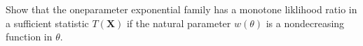 
\begin{exercise}

Show that the oneparameter exponential family has a monotone liklihood ratio in a sufficient statistic $T(\mathbf X)$ if the natural parameter $w(\theta)$ is a nondecreasing function in $\theta$.

\end{exercise}


\begin{solution}

\phantom{}

\end{solution}


